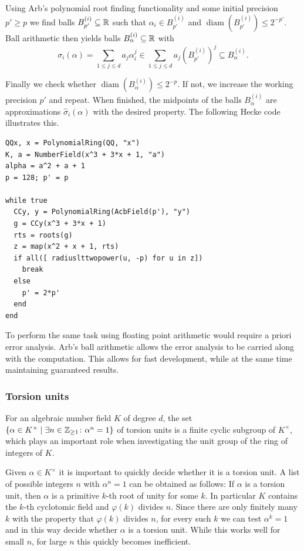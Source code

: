 \documentclass{sig-alternate-05-2015}
\begin{document}
Using Arb's polynomial root finding functionality and some initial precision $p' \geq p$ we find balls $B_{p'}^{(i)} \subseteq \mathbb{R}$ such
that $\alpha_i \in B_{p'}^{(i)}$ and $\operatorname{diam}(B_{p'}^{(i)}) \leq 2^{-p'}$.
Ball arithmetic then yields balls $B_\alpha^{(i)} \subseteq \mathbb{R}$ with
\[ \sigma_i(\alpha) = \sum_{1 \leq j \leq d} a_j \alpha_i^j \in \sum_{1 \leq j \leq d} a_j (B_{p'}^{(i)})^j\subseteq B_\alpha^{(i)}. \]

Finally we check whether $\operatorname{diam}(B_\alpha^{(i)}) \leq 2^{-p}$. If not, we increase the working precision $p'$ and repeat.
When finished, the midpoints of the balls $B_\alpha^{(i)}$ are approximations $\hat \sigma_i(\alpha)$ with the desired property.
The following Hecke code illustrates this.

\begin{verbatim}
QQx, x = PolynomialRing(QQ, "x")
K, a = NumberField(x^3 + 3*x + 1, "a")
alpha = a^2 + a + 1
p = 128; p' = p

while true
  CCy, y = PolynomialRing(AcbField(p'), "y")
  g = CCy(x^3 + 3*x + 1)
  rts = roots(g)
  z = map(x^2 + x + 1, rts)
  if all([ radiuslttwopower(u, -p) for u in z])
    break
  else
    p' = 2*p'
  end
end
\end{verbatim}

To perform the same task using floating point arithmetic would require a priori error analysis.
Arb's ball arithmetic allows the error analysis to be carried along with the computation. This allows for fast development,
while at the same time maintaining guaranteed results.

\subsubsection{Torsion units}

For an algebraic number field $K$ of degree $d$, the set $\{ \alpha \in K^\times \mid \exists n \in \mathbb{Z}_{\geq 1} \colon \alpha^n = 1 \}$ of
torsion units is a finite cyclic subgroup of $K^\times$, which plays an important role
when investigating the unit group of the ring of integers of $K$.

Given $\alpha \in K^\times$ it is important to quickly decide whether it is a torsion unit.
A list of possible integers $n$ with $\alpha^n = 1$ can be obtained as follows:
If $\alpha$ is a torsion unit, then $\alpha$ is a primitive $k$-th root of unity for some $k$.
In particular $K$ contains the $k$-th cyclotomic field and $\varphi(k)$ divides $n$.
Since there are only finitely many $k$ with the property that $\varphi(k)$ divides $n$,
for every such $k$ we can test $\alpha^k = 1$ and in this way decide whether $\alpha$ is a torsion unit.
While this works well for small $n$, for large $n$ this quickly becomes inefficient.
\end{document}
